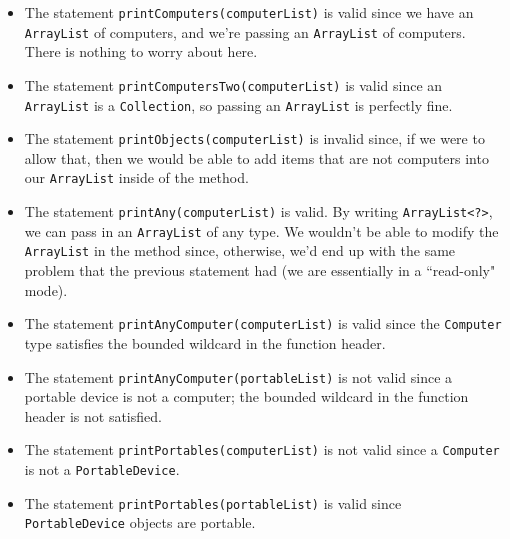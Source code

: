 \begin{itemize}
    \item The statement \verb!printComputers(computerList)! is valid since we have an \verb!ArrayList! of computers, and we're passing an \verb!ArrayList! of computers. There is nothing to worry about here.
    \item The statement \verb!printComputersTwo(computerList)! is valid since an \verb!ArrayList! is a \verb!Collection!, so passing an \verb!ArrayList! is perfectly fine. 
    \item The statement \verb!printObjects(computerList)! is invalid since, if we were to allow that, then we would be able to add items that are not computers into our \verb!ArrayList! inside of the method.
    \item The statement \verb!printAny(computerList)! is valid. By writing \verb!ArrayList<?>!, we can pass in an \verb!ArrayList! of any type. We wouldn't be able to modify the \verb!ArrayList! in the method since, otherwise, we'd end up with the same problem that the previous statement had (we are essentially in a ``read-only" mode).
    \item The statement \verb!printAnyComputer(computerList)! is valid since the \verb!Computer! type satisfies the bounded wildcard in the function header.
    \item The statement \verb!printAnyComputer(portableList)! is not valid since a portable device is not a computer; the bounded wildcard in the function header is not satisfied.
    \item The statement \verb!printPortables(computerList)! is not valid since a \verb!Computer! is not a \verb!PortableDevice!.
    \item The statement \verb!printPortables(portableList)! is valid since \verb!PortableDevice! objects are portable.
\end{itemize}